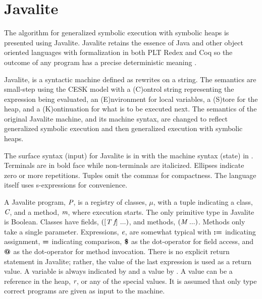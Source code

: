 \section{Javalite}
The algorithm for generalized symbolic execution with symbolic heaps
is presented using Javalite. Javalite retains the essence of Java and
other object oriented languages with formalization in both PLT
Redex and Coq so the outcome of any program has a precise
deterministic meaning \cite{saints-MS}.

Javalite, is a syntactic machine defined as rewrites on a string.  The
semantics are small-step using the CESK model with a (C)ontrol string
representing the expression being evaluated, an (E)nvironment for
local variables, a (S)tore for the heap, and a (K)ontinuation for what
is to be executed next.  The semantics of the original Javalite
machine, and its machine syntax, are changed to reflect generalized
symbolic execution and then generalized execution with symbolic heaps.

The surface syntax (input) for Javalite is in
 with the machine syntax (state) in
. Terminals are in bold face while
non-terminals are italicized. Ellipses indicate zero or more
repetitions. Tuples omit the commas for compactness. The language
itself uses s-expressions for convenience.




A Javalite program, $\emph{P}$, is a registry of classes, $\mu$, with
a tuple indicating a class, $\emph{C}$, and a method, $\emph{m}$,
where execution starts. The only primitive type in Javalite is
Boolean. Classes have fields, $([\emph{T}\ \emph{f}]\ ...)$, and
methods, $(\emph{M}\ ...)$. Methods only take a single
parameter. Expressions, $\emph{e}$, are somewhat typical with
$\textbf{:=}$ indicating assignment, $\textbf{=}$ indicating comparison,
$\textbf{\$}$ as the dot-operator for field access, and $\textbf{@}$ as
the dot-operator for method invocation. There is no explicit return
statement in Javalite; rather, the value of the last expression is
used as a return value. A variable is always indicated by 
and a value by . A value can be a reference in the heap,
$\emph{r}$, or any of the special values. It is assumed that only
type correct programs are given as input to the machine.

